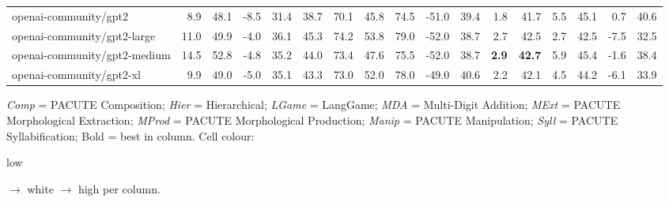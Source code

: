 \documentclass{article}
\begin{document}
\begin{table}[htbp]
\begin{threeparttable}
\begin{adjustbox}{max width=\textwidth}
\begin{tabular}{lrrrrrrrrrrrrrrrr}
openai-community/gpt2 & \cellcolor[HTML]{F4A582}8.9 & \cellcolor[HTML]{F4A582}48.1 & \cellcolor[HTML]{F4A582}-8.5 & \cellcolor[HTML]{F4A582}31.4 & \cellcolor[HTML]{F4A582}38.7 & \cellcolor[HTML]{F4A582}70.1 & \cellcolor[HTML]{F4A582}45.8 & \cellcolor[HTML]{F4A582}74.5 & \cellcolor[HTML]{F7BEA5}-51.0 & \cellcolor[HTML]{F7BFA6}39.4 & \cellcolor[HTML]{B7D9E9}1.8 & \cellcolor[HTML]{B6D8E9}41.7 & \cellcolor[HTML]{F4AC8C}5.5 & \cellcolor[HTML]{F5AF90}45.1 & \cellcolor[HTML]{F6BAA0}0.7 & \cellcolor[HTML]{F7C2AB}40.6 \\
openai-community/gpt2-large & \cellcolor[HTML]{F6B99E}11.0 & \cellcolor[HTML]{F6BBA1}49.9 & \cellcolor[HTML]{F6BAA0}-4.0 & \cellcolor[HTML]{F7BEA6}36.1 & \cellcolor[HTML]{F9D4C4}45.3 & \cellcolor[HTML]{FAD9CA}74.2 & \cellcolor[HTML]{F7C4AE}53.8 & \cellcolor[HTML]{F8CAB5}79.0 & \cellcolor[HTML]{F4A582}-52.0 & \cellcolor[HTML]{F4A582}38.7 & \cellcolor[HTML]{99C8E0}2.7 & \cellcolor[HTML]{99C8E0}42.5 & \cellcolor[HTML]{F4A582}2.7 & \cellcolor[HTML]{F4A582}42.5 & \cellcolor[HTML]{F4A582}-7.5 & \cellcolor[HTML]{F4A582}32.5 \\
openai-community/gpt2-medium & \cellcolor[HTML]{FADBCD}14.5 & \cellcolor[HTML]{FBDFD3}52.8 & \cellcolor[HTML]{F6B69A}-4.8 & \cellcolor[HTML]{F6BA9F}35.2 & \cellcolor[HTML]{F8CBB7}44.0 & \cellcolor[HTML]{F9CEBC}73.4 & \cellcolor[HTML]{F4AC8B}47.6 & \cellcolor[HTML]{F5AD8D}75.5 & \cellcolor[HTML]{F4A582}-52.0 & \cellcolor[HTML]{F4A582}38.7 & \cellcolor[HTML]{92C5DE}\textbf{2.9} & \cellcolor[HTML]{92C5DE}\textbf{42.7} & \cellcolor[HTML]{F5AD8E}5.9 & \cellcolor[HTML]{F5B092}45.4 & \cellcolor[HTML]{F5B497}-1.6 & \cellcolor[HTML]{F6BAA0}38.4 \\
openai-community/gpt2-xl & \cellcolor[HTML]{F5AE8F}9.9 & \cellcolor[HTML]{F5AF90}49.0 & \cellcolor[HTML]{F6B599}-5.0 & \cellcolor[HTML]{F6B99E}35.1 & \cellcolor[HTML]{F8C6B0}43.3 & \cellcolor[HTML]{F8C9B5}73.0 & \cellcolor[HTML]{F7BDA4}52.0 & \cellcolor[HTML]{F7C2AA}78.0 & \cellcolor[HTML]{FDF2ED}-49.0 & \cellcolor[HTML]{FDF3EE}40.6 & \cellcolor[HTML]{A8D1E4}2.2 & \cellcolor[HTML]{A7D0E4}42.1 & \cellcolor[HTML]{F4AA89}4.5 & \cellcolor[HTML]{F4AC8B}44.2 & \cellcolor[HTML]{F4A886}-6.1 & \cellcolor[HTML]{F4AA89}33.9 \\
\bottomrule
\end{tabular}
\end{adjustbox}
\begin{tablenotes}[flushleft]\footnotesize
\item \textit{Comp} = PACUTE Composition; \textit{Hier} = Hierarchical; \textit{LGame} = LangGame; \textit{MDA} = Multi-Digit Addition; \textit{MExt} = PACUTE Morphological Extraction; \textit{MProd} = PACUTE Morphological Production; \textit{Manip} = PACUTE Manipulation; \textit{Syll} = PACUTE Syllabification; Bold = best in column. Cell colour: \colorbox[HTML]{F4A582}{\strut low} $\to$ white $\to$ \colorbox[HTML]{92C5DE}{high} per column.
\end{tablenotes}
\end{threeparttable}
\end{table}
\end{document}
